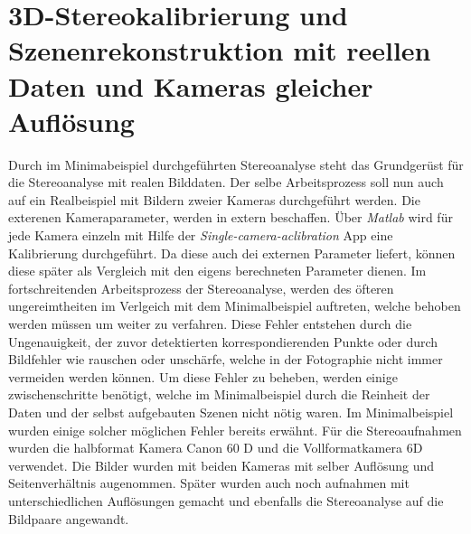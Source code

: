 \chapter{3D-Stereokalibrierung und Szenenrekonstruktion mit reellen Daten und Kameras gleicher Auflösung}


Durch im Minimabeispiel durchgeführten Stereoanalyse steht das Grundgerüst für die Stereoanalyse mit realen Bilddaten. Der selbe Arbeitsprozess soll nun auch auf ein Realbeispiel mit Bildern zweier Kameras durchgeführt werden. Die exterenen Kameraparameter, werden in extern beschaffen. Über \textit{Matlab} wird für jede Kamera einzeln mit Hilfe der \textit{Single-camera-aclibration} App eine Kalibrierung durchgeführt. Da diese auch dei externen Parameter liefert, können diese später als Vergleich mit den eigens berechneten Parameter dienen. Im fortschreitenden Arbeitsprozess der Stereoanalyse, werden des öfteren ungereimtheiten im Verlgeich mit dem Minimalbeispiel auftreten, welche behoben werden müssen um weiter zu verfahren. Diese Fehler entstehen durch die Ungenauigkeit, der zuvor detektierten korrespondierenden Punkte oder durch Bildfehler wie rauschen oder unschärfe, welche in der Fotographie nicht immer vermeiden werden können. Um diese Fehler zu beheben, werden einige zwischenschritte benötigt, welche im Minimalbeispiel durch die Reinheit der Daten und der selbst aufgebauten Szenen nicht nötig waren. Im Minimalbeispiel wurden einige solcher möglichen Fehler bereits erwähnt. Für die Stereoaufnahmen wurden die halbformat Kamera Canon 60 D und die Vollformatkamera 6D verwendet. Die Bilder wurden mit beiden Kameras mit selber Auflösung und Seitenverhältnis augenommen. Später wurden auch noch aufnahmen mit unterschiedlichen Auflösungen gemacht und ebenfalls die Stereoanalyse auf die Bildpaare angewandt.  \\

